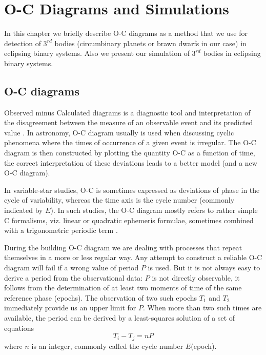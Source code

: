 \chapter{O-C Diagrams and Simulations}
\label{ch:oc_sim}

In this chapter we briefly describe O-C diagrams as a method that we use for 
detection of $3^{rd}$ bodies (circumbinary planets or brawn dwarfs in our case) in eclipsing binary systems.
Also we present our simulation of $3^{rd}$ bodies in eclipsing binary systems.

\section{O-C diagrams}
Observed minus Calculated diagrams is a diagnostic tool and interpretation 
of the disagreement between the measure of an observable event and its predicted value \citep{Sterken2005basic}.
In astronomy, O-C diagram usually is used when discussing cyclic phenomena where the times of occurrence of a given event is irregular. 
The O-C diagram is then constructed by plotting the quantity O-C as a function of time, the correct interpretation 
of these deviations leads to a better model (and a new O-C diagram).

In variable-star studies, O-C is sometimes expressed as deviations of phase
in the cycle of variability, whereas the time axis is the cycle number (commonly indicated by $E$). 
In such studies, the O-C diagram mostly refers to rather simple C formalisms, viz. linear or quadratic ephemeris formulae, sometimes
combined with a trigonometric periodic term \citep{Sterken2005basic}.

During the building O-C diagram we are dealing with processes that repeat themselves in a more or less regular way.
Any attempt to construct a reliable O-C diagram will fail if a wrong value of period $P$ is used. 
But it is not always easy to derive a period from the observational data: 
$P$ is not directly observable, it follows from the
determination of at least two moments of time of the same reference phase (epochs). 
The observation of two such epochs $T_{1}$ and $T_{2}$ immediately provide us an upper limit for $P$. 
When more than two such times are available, the period can be derived by a least-squares solution of a set of
equations
\begin{equation} \label{eq:period}
T_{i} - T_{j} = nP
\end{equation}
where $n$ is an integer, commonly called the cycle number $E$(epoch).

